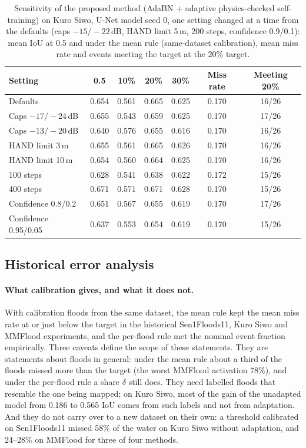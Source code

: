 \begin{table}[pos=t]
\caption{Sensitivity of the proposed method (AdaBN + adaptive physics-checked self-training) on Kuro Siwo, U-Net model seed 0, one setting changed at a time from the defaults (caps $-15/-22$\,dB, HAND limit 5\,m, 200 steps, confidence 0.9/0.1): mean IoU at 0.5 and under the mean rule (same-dataset calibration), mean miss rate and events meeting the target at the 20\% target.}
\label{tab:sens}
\centering
\begin{tabular}{lcccccc}
\toprule
Setting & 0.5 & 10\% & 20\% & 30\% & Miss rate & Meeting 20\% \\
\midrule
Defaults & 0.654 & 0.561 & 0.665 & 0.625 & 0.170 & 16/26 \\
Caps $-17/-24$\,dB & 0.655 & 0.543 & 0.659 & 0.625 & 0.170 & 17/26 \\
Caps $-13/-20$\,dB & 0.640 & 0.576 & 0.655 & 0.616 & 0.170 & 16/26 \\
HAND limit 3\,m & 0.655 & 0.561 & 0.665 & 0.626 & 0.170 & 16/26 \\
HAND limit 10\,m & 0.654 & 0.560 & 0.664 & 0.625 & 0.170 & 16/26 \\
100 steps & 0.628 & 0.541 & 0.638 & 0.622 & 0.172 & 15/26 \\
400 steps & 0.671 & 0.571 & 0.671 & 0.628 & 0.170 & 15/26 \\
Confidence 0.8/0.2 & 0.651 & 0.567 & 0.655 & 0.619 & 0.170 & 17/26 \\
Confidence 0.95/0.05 & 0.637 & 0.553 & 0.654 & 0.619 & 0.170 & 15/26 \\
\bottomrule
\end{tabular}
\end{table}


\subsection{Historical error analysis}
\label{sec:historical_errors}
\paragraph{What calibration gives, and what it does not.} With calibration floods from the same dataset, the mean rule kept the mean miss rate at or just below the target in the historical Sen1Floods11, Kuro Siwo and MMFlood experiments, and the per-flood rule met the nominal event fraction empirically. Three caveats define the scope of these statements. They are statements about floods in general: under the mean rule about a third of the floods missed more than the target (the worst MMFlood activation 78\%), and under the per-flood rule a share $\delta$ still does. They need labelled floods that resemble the one being mapped; on Kuro Siwo, most of the gain of the unadapted model from 0.186 to 0.565 IoU comes from such labels and not from adaptation. And they do not carry over to a new dataset on their own: a threshold calibrated on Sen1Floods11 missed 58\% of the water on Kuro Siwo without adaptation, and 24--28\% on MMFlood for three of four methods.

